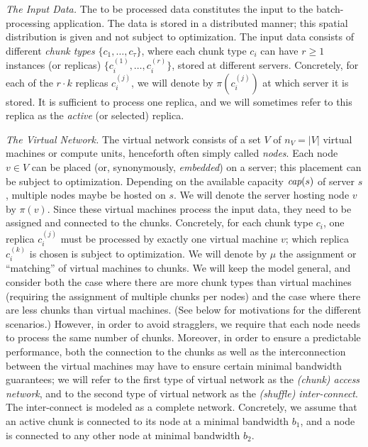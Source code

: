 \documentclass[9pt,twocolumn]{scrartcl}
\newcommand{\ChunkType}{\tau}
\newcommand{\VirtualNodes}{\ensuremath{V}}
\newcommand{\achunk}{\ensuremath{c}}
\newcommand{\capacity}{\emph{cap}}
\newcommand{\CostTrans}{\ensuremath{b_1}}
\newcommand{\CostCom}{\ensuremath{b_2}}
\begin{document}
\emph{The Input Data.} The to be processed data constitutes the input to the batch-processing application.
The data is stored in a distributed manner; this spatial distribution is given and not subject to optimization.
The input data consists of different \emph{chunk types} $\{\achunk_1, \ldots, \achunk_{\ChunkType}\}$,
where each chunk type $\achunk_i$ can have $r\geq 1$ instances (or replicas) $\{\achunk_{i}^{(1)},\ldots, \achunk_{i}^{(r)}\}$,
 stored at different servers.
Concretely, for each of the $r\cdot k$ replicas $\achunk_{i}^{(j)}$, we will denote by $\pi(\achunk_{i}^{(j)})$ at
which server it is stored. It is sufficient to process one replica, and we will sometimes refer to this
replica as the \emph{active} (or selected) replica.

\emph{The Virtual Network.} The virtual network consists of a set $\VirtualNodes$ of $n_V=|\VirtualNodes|$ virtual machines or compute
 units, henceforth often simply called \emph{nodes}.
Each node $v \in \VirtualNodes$ can be placed (or, synonymously, \emph{embedded}) on a server; this placement can be subject
to optimization.
Depending on the available capacity $\capacity(s)$ of server $s$, multiple nodes maybe be hosted on $s$.
We will denote the server hosting node $v$ by $\pi(v)$.
Since these virtual machines process the input data, they need to be assigned and connected to the
chunks. Concretely, for each chunk type $\achunk_i$, one replica $\achunk_{i}^{(j)}$ must be processed by exactly one virtual machine $v$;
which replica $\achunk_{i}^{(k)}$ is chosen is subject to optimization.
We will denote by $\mu$ the assignment or ``matching'' of virtual machines to chunks.
We will keep the model general, and consider both the case where there are more chunk types
than virtual machines (requiring the assignment of multiple chunks per nodes) and the case
where there are less chunks than virtual machines. (See below for motivations for the different scenarios.)
However, in order to avoid stragglers, we require that each node needs to process the same number of chunks.
Moreover, in order to ensure a predictable performance, both the connection to the chunks
as well as the interconnection between the virtual machines may have to ensure certain
minimal bandwidth guarantees; we will refer to the first type of virtual network as the \emph{(chunk) access
network}, and to the second type of virtual network as the \emph{(shuffle) inter-connect}. The inter-connect 
is modeled as a complete network. Concretely, we assume that an  active chunk
is connected to its node at a minimal bandwidth $\CostTrans$, and a node is connected to any other node
at minimal bandwidth $\CostCom$.
\end{document}
